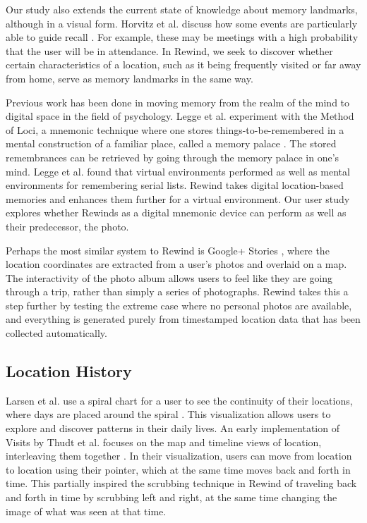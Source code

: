 \documentclass{sigchi}
\begin{document}
Our study also extends the current state of knowledge about memory landmarks, although in a visual form. Horvitz et al. discuss how some events are particularly able to guide recall \cite{horvitz2004learning}. For example, these may be meetings with a high probability that the user will be in attendance. In Rewind, we seek to discover whether certain characteristics of a location, such as it being frequently visited or far away from home, serve as memory landmarks in the same way. 

Previous work has been done in moving memory from the realm of the mind to digital space in the field of psychology. Legge et al. experiment with the Method of Loci, a mnemonic technique where one stores things-to-be-remembered in a mental construction of a familiar place, called a memory palace \cite{legge2012building}. The stored remembrances can be retrieved by going through the memory palace in one's mind. Legge et al. found that virtual environments performed as well as mental environments for remembering serial lists. Rewind takes digital location-based memories and enhances them further for a virtual environment. Our user study explores whether Rewinds as a digital mnemonic device can perform as well as their predecessor, the photo.

Perhaps the most similar system to Rewind is Google+ Stories \cite{googlestories}, where the location coordinates are extracted from a user's photos and overlaid on a map. The interactivity of the photo album allows users to feel like they are going through a trip, rather than simply a series of photographs. Rewind takes this a step further by testing the extreme case where no personal photos are available, and everything is generated purely from timestamped location data that has been collected automatically.

\subsection{Location History}
Larsen et al. use a spiral chart for a user to see the continuity of their locations, where days are placed around the spiral \cite{larsen2013qs}. This visualization allows users to explore and discover patterns in their daily lives. An early implementation of Visits by Thudt et al. focuses on the map and timeline views of location, interleaving them together \cite{thudt2013visits}. In their visualization, users can move from location to location using their pointer, which at the same time moves back and forth in time. This partially inspired the scrubbing technique in Rewind of traveling back and forth in time by scrubbing left and right, at the same time changing the image of what was seen at that time.
 
\end{document}
